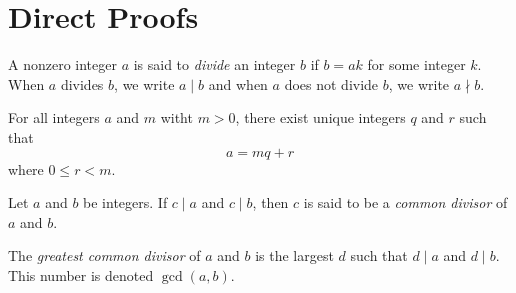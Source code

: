 \chapter{Direct Proofs}

\begin{definition}
	A nonzero integer $a$ is said to \emph{divide} an integer $b$ if $b = ak$ for some integer $k$. When $a$ divides $b$, we write $a \mid b$ and when $a$ does not divide $b$, we write $a \nmid b$.
\end{definition}

\begin{theorem}
	For all integers $a$ and $m$ witht $m > 0$, there exist unique integers $q$ and $r$ such that 
	$$a = mq+r$$
	where $0 \leq r < m$.
\end{theorem}

\begin{definition}
	Let $a$ and $b$ be integers. If $c \mid a$ and $c \mid b$, then $c$ is said to be a \emph{common divisor} of $a$ and $b$.

	The \emph{greatest common divisor} of $a$ and $b$ is the largest $d$ such that $d \mid a$ and $d \mid b$. This number is denoted $\gcd(a,b)$.
\end{definition}
